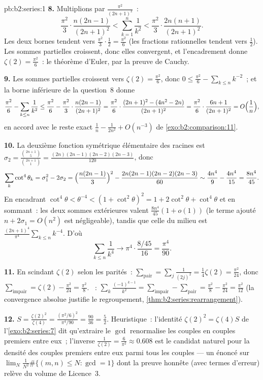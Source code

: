 \begin{solution}{pb:b2:series:1}
\textbf{8.} Multiplions par $\frac{\pi^2}{(2n+1)^2}$~:
\[
\frac{\pi^2}{3}\cdot\frac{n(2n-1)}{(2n+1)^2}
< \sum_{k=1}^{n}\frac1{k^2} <
\frac{\pi^2}{3}\cdot\frac{2n(n+1)}{(2n+1)^2}.
\]
Les deux bornes tendent vers $\frac{\pi^2}3\cdot\frac12 =
\frac{\pi^2}6$ (les fractions rationnelles tendent vers $\frac12$).
Les sommes partielles croissent, donc elles convergent, et
l'encadrement donne $\zeta(2) = \frac{\pi^2}6$~: le théorème d'Euler,
par la preuve de Cauchy.

\textbf{9.} Les sommes partielles croissent vers $\zeta(2) =
\frac{\pi^2}6$, donc $0 \leq \frac{\pi^2}6 - \sum_{k\leq n}k^{-2}$~;
et la borne inférieure de la question~8 donne
\[
\frac{\pi^2}6 - \sum_{k\leq n}\frac1{k^2}
\leq \frac{\pi^2}6 - \frac{\pi^2}3\cdot\frac{n(2n-1)}{(2n+1)^2}
= \frac{\pi^2}6\cdot\frac{(2n+1)^2 - (4n^2 -
2n)}{(2n+1)^2}
= \frac{\pi^2}6\cdot\frac{6n + 1}{(2n+1)^2}
= O\Bigl(\frac1n\Bigr),
\]
en accord avec le reste exact $\frac1n - \frac1{2n^2} + O(n^{-3})$ de
\cref{exo:b2:comparison:11}.

\textbf{10.} La deuxième fonction symétrique élémentaire des racines
est $\sigma_2 = \frac{\binom{2n+1}5}{\binom{2n+1}1} =
\frac{(2n)(2n-1)(2n-2)(2n-3)}{120}$, donc
\[
\sum_k\cot^4\theta_k = \sigma_1^2 - 2\sigma_2
= \Bigl(\frac{n(2n-1)}3\Bigr)^2 -
\frac{2n(2n-1)(2n-2)(2n-3)}{60}
\sim \frac{4n^4}9 - \frac{4n^4}{15} = \frac{8n^4}{45}.
\]
En encadrant $\cot^4\theta < \theta^{-4} < (1 + \cot^2\theta)^2 =
1 + 2\cot^2\theta + \cot^4\theta$ et en sommant~: les deux sommes
extérieures valent $\frac{8n^4}{45}(1 + o(1))$ (le terme ajouté $n +
2\sigma_1 = O(n^2)$ est négligeable), tandis que celle du milieu est
$\frac{(2n+1)^4}{\pi^4}\sum_{k\leq n}k^{-4}$. D'où
\[
\sum_{k\leq n}\frac1{k^4} \longrightarrow
\pi^4\cdot\frac{8/45}{16} = \frac{\pi^4}{90}.
\]

\textbf{11.} En scindant $\zeta(2)$ selon les parités~:
$\sum_{\text{pair}} = \sum_j\frac{1}{(2j)^2} = \frac14\zeta(2) =
\frac{\pi^2}{24}$, donc $\sum_{\text{impair}} = \zeta(2) -
\frac{\pi^2}{24} = \frac{\pi^2}8$. ~:
$\sum_k\frac{(-1)^{k-1}}{k^2} = \sum_{\text{impair}} -
\sum_{\text{pair}} = \frac{\pi^2}8 - \frac{\pi^2}{24} =
\frac{\pi^2}{12}$ (la convergence absolue justifie le regroupement,
\cref{thm:b2:series:rearrangement}).

\textbf{12.} $S = \frac{\zeta(2)^2}{\zeta(4)} =
\frac{(\pi^2/6)^2}{\pi^4/90} = \frac{90}{36} = \frac52$.
Heuristique~: l'identité $\zeta(2)^2 = \zeta(4)S$ de
l'\cref{exo:b2:series:7} dit qu'extraire le $\gcd$ renormalise les
couples en couples premiers entre eux~; l'inverse
$\frac1{\zeta(2)} = \frac6{\pi^2} \approx 0.608$ est le candidat
naturel pour la densité des couples premiers entre eux parmi tous les
couples --- un énoncé sur $\lim_N \frac{1}{N^2}\#\{(m,n) \leq N :
\gcd = 1\}$ dont la preuve honnête (avec termes d'erreur) relève du
volume de Licence~3.


\end{solution}

